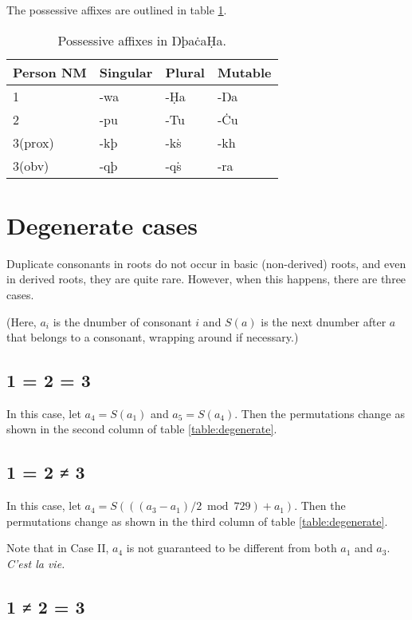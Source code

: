 \documentclass{book}
\newcommand{\lname}{ŊþaċaḤa}
\begin{document}
The possessive affixes are outlined in table \ref{table:declension2}.

\begin{table}[h]
  \caption{Possessive affixes in \lname.}
  \label{table:declension2}
  \centering
  \begin{tabular}{l|lll}
    Person \bs{} NM & Singular & Plural & Mutable \\
    \hline
    1 & -wa & -Ḥa & -Ŋa \\
    2 & -pu & -Tu & -Ċu \\
    3(prox) & -kþ & -kṡ & -kh \\
    3(obv) & -qþ & -qṡ & -ra \\
  \end{tabular}
\end{table}

\section{Degenerate cases}

Duplicate consonants in roots do not occur in basic (non-derived) roots, and even in derived roots, they are quite rare. However, when this happens, there are three cases.

(Here, $a_i$ is the dnumber of consonant $i$ and $S(a)$ is the next dnumber after $a$ that belongs to a consonant, wrapping around if necessary.)

\subsection{1 = 2 = 3}

In this case, let $a_4 = S(a_1)$ and $a_5 = S(a_4)$. Then the permutations change as shown in the second column of table \ref{table:degenerate}.

\subsection{1 = 2 ≠ 3}

In this case, let $a_4 = S(((a_3 - a_1) / 2 \bmod 729) + a_1)$. Then the permutations change as shown in the third column of table \ref{table:degenerate}.

Note that in Case II, $a_4$ is not guaranteed to be different from both $a_1$ and $a_3$. \emph{C'est la vie.}

\subsection{1 ≠ 2 = 3}
\end{document}
